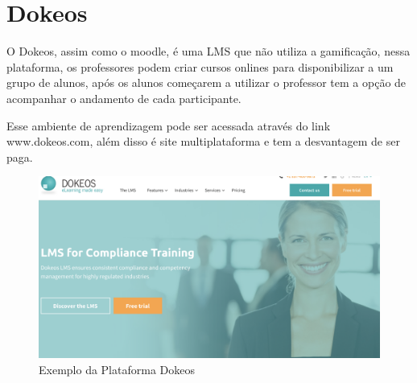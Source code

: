 \section{Dokeos}

O Dokeos, assim como o moodle, é uma LMS que não utiliza a gamificação, nessa plataforma, os professores podem criar cursos onlines para disponibilizar a um grupo de alunos, após os alunos começarem a utilizar o professor tem a opção de acompanhar o andamento de cada participante.

Esse ambiente de aprendizagem pode ser acessada através do link www.dokeos.com, além disso é site multiplataforma e tem a desvantagem de ser paga.

\begin{figure}[htp]
\begin{center}
  \includegraphics[width=15cm]{images/trabalhos-relacionados-img/img5-Dokeos.png}
  \caption{Exemplo da Plataforma Dokeos}
  \label{fig:exampleDokeos}
\end{center}
\end{figure}

